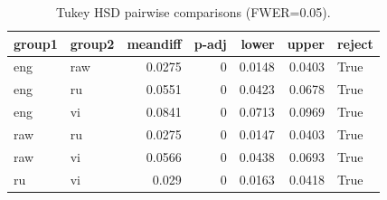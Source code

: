 \begin{table}
\caption{Tukey HSD pairwise comparisons (FWER=0.05).}
\label{tab:tukey_hsd_demo}
\begin{tabular}{l l r r r r l}
\toprule
group1 & group2 & meandiff & p-adj & lower & upper & reject \\
\midrule
eng & raw & 0.0275 & 0 & 0.0148 & 0.0403 & True \\
eng & ru & 0.0551 & 0 & 0.0423 & 0.0678 & True \\
eng & vi & 0.0841 & 0 & 0.0713 & 0.0969 & True \\
raw & ru & 0.0275 & 0 & 0.0147 & 0.0403 & True \\
raw & vi & 0.0566 & 0 & 0.0438 & 0.0693 & True \\
ru & vi & 0.029 & 0 & 0.0163 & 0.0418 & True \\
\bottomrule
\end{tabular}
\end{table}
